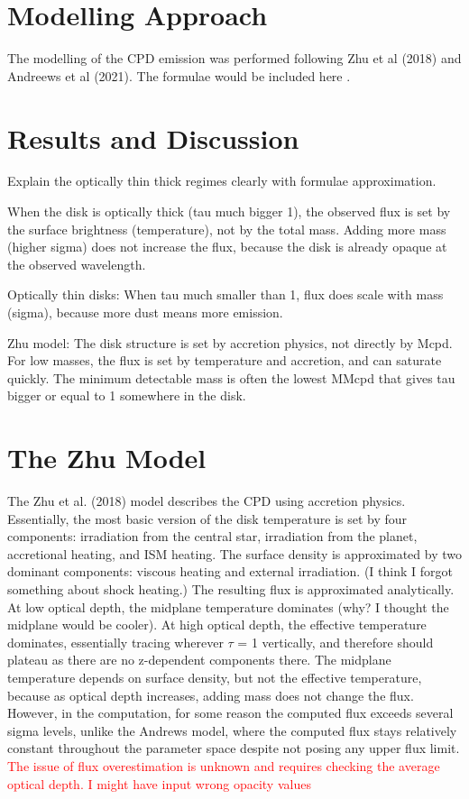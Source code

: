 \documentclass{article}
\begin{document}
\section{Modelling Approach}

The modelling of the CPD emission was performed following Zhu et al (2018) and Andreews et al (2021). The formulae would be included here .

\section{Results and Discussion}
 Explain the optically thin thick regimes  clearly with formulae approximation. 

When the disk is optically thick (tau much bigger 1), the observed flux is set by the surface brightness (temperature), not by the total mass.
Adding more mass (higher sigma) does not increase the flux, because the disk is already opaque at the observed wavelength.

Optically thin disks:
When tau much smaller than 1, flux does scale with mass (sigma), because more dust means more emission.

Zhu model:
The disk structure is set by accretion physics, not directly by Mcpd.
For low masses, the flux is set by temperature and accretion, and can saturate quickly.
The minimum detectable mass is often the lowest MMcpd that gives tau bigger or equal to 1 somewhere in the disk.




\section{The Zhu Model}

The Zhu et al. (2018) model describes the CPD using accretion physics.
Essentially, the most basic version of the disk temperature is set by four components: irradiation from the central star, irradiation from the planet, accretional heating, and ISM heating.
The surface density is approximated by two dominant components: viscous heating and external irradiation.
(I think I forgot something about shock heating.)
The resulting flux is approximated analytically. At low optical depth, the midplane temperature dominates (why? I thought the midplane would be cooler).
At high optical depth, the effective temperature dominates, essentially tracing wherever $\tau$ = 1 vertically, and therefore should plateau as there are no z-dependent components there.
The midplane temperature depends on surface density, but not the effective temperature, because as optical depth increases, adding mass does not change the flux.
However, in the computation, for some reason the computed flux exceeds several sigma levels, unlike the Andrews model, where the computed flux stays relatively constant throughout the parameter space despite not posing any upper flux limit.
\textcolor{red}{The issue of flux overestimation is unknown and requires checking the average optical depth. I might have input wrong opacity values}
\end{document}
